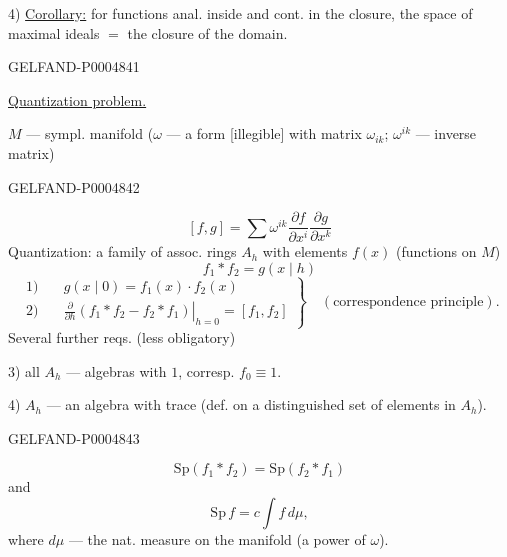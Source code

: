 4) \uline{Corollary:} for functions anal. inside and cont. in the closure,
the space of maximal ideals $=$ the closure of the domain.


\begin{GelfandAdjacentEvidence}{GELFAND-P000484}{1}

\uline{Quantization problem.}

$M$ — sympl. manifold
($\omega$ — a form [illegible] with matrix $\omega_{ik}$;
$\omega^{ik}$ — inverse matrix)
\end{GelfandAdjacentEvidence}
\begin{GelfandAdjacentEvidence}{GELFAND-P000484}{2}

\[
[f,g]=\sum\omega^{ik}\frac{\partial f}{\partial x^i}
\frac{\partial g}{\partial x^k}
\]
Quantization: a family of assoc. rings $A_h$ with elements $f(x)$ (functions on $M$)
\[
f_1\ast f_2=g(x\mid h)
\]
\[
\left.
\begin{aligned}
1)\quad &g(x\mid0)=f_1(x)\cdot f_2(x)\\
2)\quad &\left.\frac{\partial}{\partial h}
(f_1\ast f_2-f_2\ast f_1)\right|_{h=0}=[f_1,f_2]
\end{aligned}
\right\}\quad(\text{correspondence principle}).
\]
Several further reqs. (less obligatory)

3) all $A_h$ — algebras with $1$, corresp. $f_0\equiv1$.

4) $A_h$ — an algebra with trace (def. on a distinguished set of elements in $A_h$).
\end{GelfandAdjacentEvidence}
\begin{GelfandAdjacentEvidence}{GELFAND-P000484}{3}

\[
\mathrm{Sp}(f_1\ast f_2)=\mathrm{Sp}(f_2\ast f_1)
\]
and
\[
\mathrm{Sp}\, f=c\int f\,d\mu,
\]
where $d\mu$ — the nat. measure on the manifold (a power of $\omega$).
\end{GelfandAdjacentEvidence}
